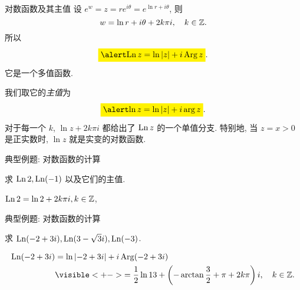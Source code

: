 \begin{frame}{对数函数及其主值}
\onslide<+->
设 $e^w=z=re^{i\theta}=e^{\ln r+i\theta}$,
\onslide<+->
则
\[w=\ln r+i\theta+2k\pi i,\quad k\in{\mathbb{Z}}.\]
\onslide<+->
所以
\[\abox{$\Ln z=\ln\abs{z}+i\Arg z$}.\]
\onslide<+->
\alert{它是一个多值函数}.

\onslide<+->
我们取它的\emph{主值}为
\[\abox{$\ln z=\ln\abs{z}+i\arg z$}.\]
\onslide<+->
对于每一个 $k$, $\ln z+2k\pi i$ 都给出了 $\operatorname{Ln} z$ 的一个单值分支.
\onslide<+->
特别地, 当 $z=x>0$ 是正实数时, $\ln z$ 就是实变的对数函数.
\end{frame}


\begin{frame}{典型例题: 对数函数的计算}
\onslide<+->
\begin{example}
求 $\operatorname{Ln} 2,\operatorname{Ln}(-1)$ 以及它们的主值.
\end{example}
\onslide<+->
\begin{solution}
$\operatorname{Ln}2=\ln2+2k\pi i, k\in{\mathbb{Z}}$,

\end{solution}
\end{frame}


\begin{frame}{典型例题: 对数函数的计算}
\onslide<+->
\begin{example}
求 $\operatorname{Ln}(-2+3i),\operatorname{Ln}(3-\sqrt3 i),\operatorname{Ln}(-3)$.
\end{example}
\onslide<+->
\begin{solution}
\vspace{-0.5\baselineskip}
\begin{align*}
\Ln(-2+3i)&=\ln\abs{-2+3i}+i\Arg(-2+3i)\\
&\visible<+->{=\frac 12\ln 13+\left(-\arctan\frac 32+\pi+2k\pi\right)i,\quad k\in\BZ.}
\end{align*}
\vspace{-\baselineskip}
\vspace{-\baselineskip}
\onslide<+->{
\[\Ln(-3)=\ln(-3)+i\Arg(-3)
\visible<+->{=\ln3+(2k+1)\pi i,\quad k\in\BZ.}\]}
\vspace{-1\baselineskip}
\end{solution}
\end{frame}


